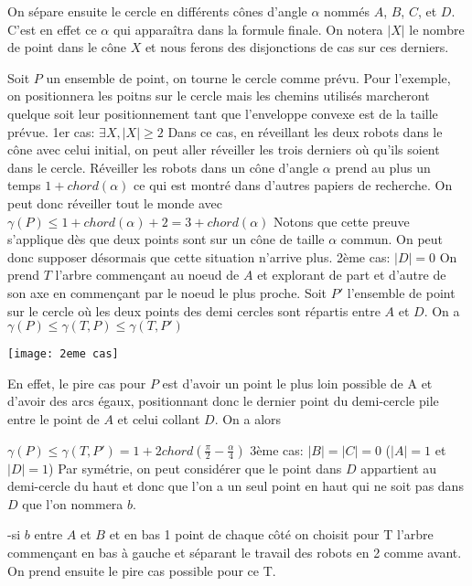On sépare ensuite le cercle en différents cônes d'angle $\alpha$ nommés $A$, $B$, $C$, et $D$. C'est en effet ce $\alpha$ qui apparaîtra dans la formule finale. On notera $|X|$ le nombre de point dans le cône $X$ et nous ferons des disjonctions de cas sur ces derniers.

Soit $P$ un ensemble de point, on tourne le cercle comme prévu. Pour l'exemple, on positionnera les poitns sur le cercle mais les chemins utilisés marcheront quelque soit leur positionnement tant que l'enveloppe convexe est de la taille prévue.
\newline
\newline
1er cas: $\exists X, |X| \geq 2$
Dans ce cas, en réveillant les deux robots dans le cône avec celui initial, on peut aller réveiller les trois derniers où qu'ils soient dans le cercle. Réveiller les robots dans un cône d'angle $\alpha$ prend au plus un temps $1 + chord(\alpha)$ ce qui est montré dans d'autres papiers de recherche.
On peut donc réveiller tout le monde avec $\gamma(P) \leq 1 + chord(\alpha) + 2 = 3 + chord(\alpha)$
Notons que cette preuve s'applique dès que deux points sont sur un cône de taille $\alpha$ commun. On peut donc supposer désormais que cette situation n'arrive plus.
\newline
\newline
2ème cas: $|D| = 0$
On prend $T$ l'arbre commençant au noeud de $A$ et explorant de part et d'autre de son axe en commençant par le noeud le plus proche.
Soit $P'$ l'ensemble de point sur le cercle où les deux points des demi cercles sont répartis entre $A$ et $D$.
On a $\gamma(P) \leq  \gamma(T, P) \leq \gamma(T, P')$

\texttt{[image: 2eme cas]}

En effet, le pire cas pour $P$ est d'avoir un point le plus loin possible de A et d'avoir des arcs égaux, positionnant donc le dernier point du demi-cercle pile entre le point de $A$ et celui collant $D$. On a alors

$\gamma(P) \leq \gamma(T, P') = 1 + 2chord(\frac{\pi}{2} - \frac{\alpha}{4})$
\newline
\newline
3ème cas: $|B| = |C| = 0$ ($|A| = 1$ et $|D| = 1$)
Par symétrie, on peut considérer que le point dans $D$ appartient au demi-cercle du haut et donc que l'on a un seul point en haut qui ne soit pas dans $D$ que l'on nommera $b$.

-si $b$ entre $A$ et $B$ et en bas 1 point de chaque côté
on choisit pour T l'arbre commençant en bas à gauche et séparant le travail des robots en 2 comme avant.
On prend ensuite le pire cas possible pour ce T.

